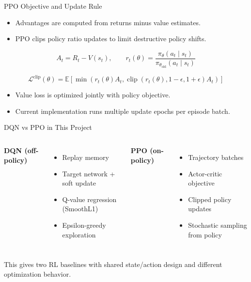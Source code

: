 \documentclass[12pt,aspectratio=169]{beamer}
\begin{document}
\begin{frame}{PPO Objective and Update Rule}
\begin{itemize}
  \item Advantages are computed from returns minus value estimates.
  \item PPO clips policy ratio updates to limit destructive policy shifts.
\end{itemize}

\[
A_t = R_t - V(s_t),\qquad
r_t(\theta)=\frac{\pi_\theta(a_t\mid s_t)}{\pi_{\theta_{\text{old}}}(a_t\mid s_t)}
\]

\[
\mathcal{L}^{\text{clip}}(\theta)=\mathbb{E}\left[\min\left(r_t(\theta)A_t,
\operatorname{clip}(r_t(\theta),1-\epsilon,1+\epsilon)A_t\right)\right]
\]

\begin{itemize}
  \item Value loss is optimized jointly with policy objective.
  \item Current implementation runs multiple update epochs per episode batch.
\end{itemize}
\end{frame}

\begin{frame}{DQN vs PPO in This Project}
\begin{columns}[T,totalwidth=\textwidth]
\textbf{DQN (off-policy)}
\begin{itemize}
  \item Replay memory
  \item Target network + soft update
  \item Q-value regression (SmoothL1)
  \item Epsilon-greedy exploration
\end{itemize}

\textbf{PPO (on-policy)}
\begin{itemize}
  \item Trajectory batches
  \item Actor-critic objective
  \item Clipped policy updates
  \item Stochastic sampling from policy
\end{itemize}
\end{columns}

\vspace{0.2cm}
\small This gives two RL baselines with shared state/action design and different optimization behavior.
\end{frame}
\end{document}
